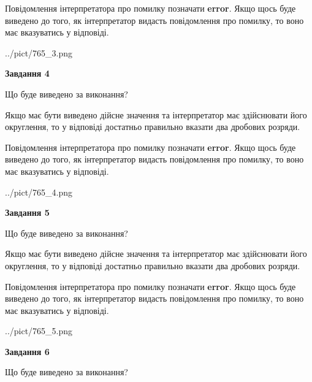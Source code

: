\documentclass[12pt, ukrainian]{article}
\begin{document}
{\begin {Large}
Повідомлення інтерпретатора про помилку позначати \textbf{error}.
Якщо щось буде виведено до того, як інтерпретатор видасть повідомлення про помилку, 
то воно має вказуватись у відповіді. \par

\begin{center}
	{../pict/765_3.png}
\end{center}
\newpage

{\begin {center}\textbf{Завдання 4}\end {center}}\par
Що буде виведено за виконання? \par

Якщо має бути виведено дійсне значення та інтерпретатор має здійснювати його округлення, 
то у відповіді достатньо правильно вказати два дробових розряди.

Повідомлення інтерпретатора про помилку позначати \textbf{error}.
Якщо щось буде виведено до того, як інтерпретатор видасть повідомлення про помилку, 
то воно має вказуватись у відповіді. \par

\begin{center}
	{../pict/765_4.png}
\end{center}
\newpage

{\begin {center}\textbf{Завдання 5}\end {center}}\par
Що буде виведено за виконання? \par

Якщо має бути виведено дійсне значення та інтерпретатор має здійснювати його округлення, 
то у відповіді достатньо правильно вказати два дробових розряди.

Повідомлення інтерпретатора про помилку позначати \textbf{error}.
Якщо щось буде виведено до того, як інтерпретатор видасть повідомлення про помилку, 
то воно має вказуватись у відповіді. \par

\begin{center}
	{../pict/765_5.png}
\end{center}
\newpage

{\begin {center}\textbf{Завдання 6}\end {center}}\par
Що буде виведено за виконання? \par


\end{Large}}
\end{document}
